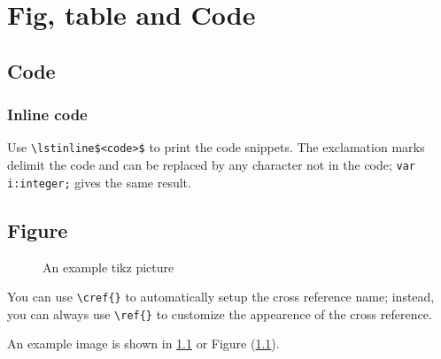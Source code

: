 \chapter{Fig, table and Code}

\section{Code}

\subsection{Inline code}
Use \lstinline|\lstinline$<code>$| to print the code snippets. The exclamation marks delimit
the code and can be replaced by any character not in the code;
\lstinline|var i:integer;| gives the same result.

\section{Figure}

\begin{figure}[!htb]
  \caption{An example tikz picture}
  \label{fig:tikz example}
\end{figure}

You can use \lstinline|\cref{}| to automatically setup the cross reference name; instead, you can always use \lstinline|\ref{}| to customize the appearence of the cross reference.

An example image is shown in \cref{fig:tikz example} or Figure (\ref{fig:tikz example}).
